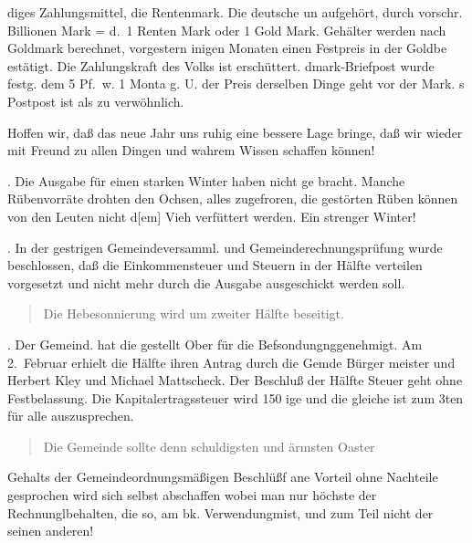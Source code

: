 

%
diges Zahlungsmittel, die Rentenmark. Die deutsche\ob
un aufgehört, durch vorschr. Billionen Mark = d.\ 1 Renten Mark oder 1 Gold Mark.\ob
Gehälter werden nach Goldmark berechnet, vorgestern\ob
inigen Monaten einen Festpreis in der Goldbe\ohb
estätigt. Die Zahlungskraft des Volks ist erschüttert.\ob
dmark-Briefpost wurde festg. dem 5 Pf.\ w. 1 Monta\unsicher\ob
g. U. der Preis derselben Dinge geht vor der Mark.\ob
s Postpost ist als zu verwöhnlich.

Hoffen wir, daß das neue Jahr uns ruhig eine bessere\ob
Lage bringe, daß wir wieder mit Freund zu allen Dingen\ob
und wahrem Wissen schaffen können!

%
.   Die Ausgabe für einen starken Winter haben nicht ge\ohb
bracht. Manche Rübenvorräte drohten den Ochsen, alles\ob
zugefroren, die gestörten Rüben können von den Leuten\ob
nicht d{[em]} Vieh verfüttert werden. Ein strenger Winter!

%
.   In der gestrigen Gemeindeversamml. und Gemeinderechnungsprüfung\ob
wurde beschlossen, daß die Einkommensteuer und Steuern\ob
in der Hälfte verteilen vorgesetzt und nicht mehr durch\ob
die Ausgabe ausgeschickt werden soll.

\pend
\begin{verse}
Die Hebesonnierung wird um zweiter Hälfte beseitigt.
\end{verse}
\pstart

%
.   Der Gemeind. hat die gestellt Ober für die Befsondungng\unsicher genehmigt.\ob
Am 2.\ Februar erhielt die Hälfte ihren Antrag durch die Gemde Bürger\ohb
meister und Herbert Kley und Michael Mattscheck\unsicher. Der Beschluß der Hälfte\ob
Steuer geht ohne Festbelassung. Die Kapitalertragssteuer wird 150%
ige und die gleiche ist zum 3ten für alle auszusprechen.

\pend
\begin{verse}
Die Gemeinde sollte denn schuldigsten und ärmsten Oaster
\end{verse}
\pstart
Gehalts der Gemeindeordnungsmäßigen Beschlüßf ane Vorteil ohne\ob
Nachteile gesprochen wird sich selbst abschaffen wobei man nur\ob
höchste der Rechnungl\unsicher behalten, die so, am bk. Verwendungm\unsicher ist, und\ob
zum Teil nicht der seinen anderen!

